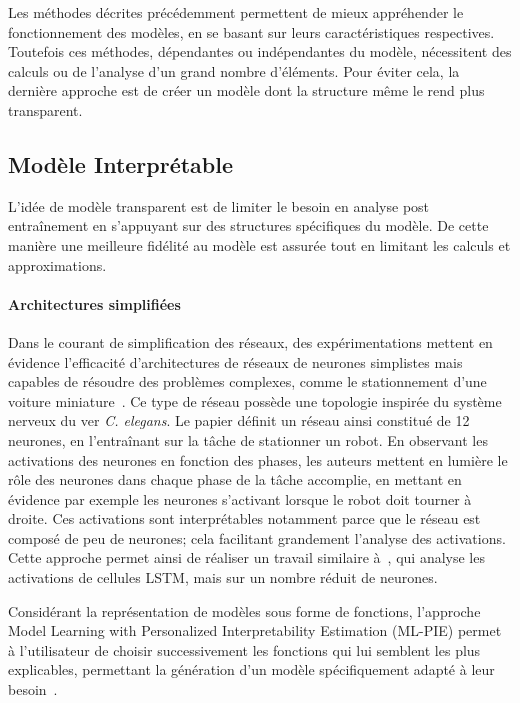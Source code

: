 Les méthodes décrites précédemment permettent de mieux appréhender le fonctionnement des modèles, en se basant sur leurs caractéristiques respectives. Toutefois ces méthodes, dépendantes ou indépendantes du modèle, nécessitent des calculs ou de l'analyse d'un grand nombre d'éléments.
 Pour éviter cela, la dernière approche est de créer un modèle dont la structure même le rend plus transparent.

\subsection{Modèle Interprétable}
L'idée de modèle transparent est de limiter le besoin en analyse post entraînement en s'appuyant sur des structures spécifiques du modèle. De cette manière une meilleure fidélité au modèle est assurée tout en limitant les calculs et approximations.


\paragraph{Architectures simplifiées}
Dans le courant de simplification des réseaux, des expérimentations mettent en évidence l'efficacité d'architectures de réseaux de neurones simplistes mais capables de résoudre des problèmes complexes, comme le stationnement d'une voiture miniature~\cite{Hasani2018}. Ce type de réseau possède une topologie inspirée du système nerveux du ver \textit{C. elegans}. Le papier définit un réseau ainsi constitué de 12 neurones, en l'entraînant sur la tâche de stationner un robot.
En observant les activations des neurones en fonction des phases, les auteurs mettent en lumière le rôle des neurones dans chaque phase de la tâche accomplie, en mettant en évidence par exemple les neurones s'activant lorsque le robot doit tourner à droite. Ces activations sont interprétables notamment parce que le réseau est composé de peu de neurones; cela facilitant grandement l'analyse des activations. Cette approche permet ainsi de réaliser un travail similaire à~\cite{Karpathy2016}, qui analyse les activations de cellules LSTM, mais sur un nombre réduit de neurones.

Considérant la représentation de modèles sous forme de fonctions, l'approche Model Learning with Personalized Interpretability Estimation (ML-PIE) permet à l'utilisateur de choisir successivement les fonctions qui lui semblent les plus explicables,  permettant la génération d'un modèle spécifiquement adapté à leur besoin~\cite{Virgolin2021}.

